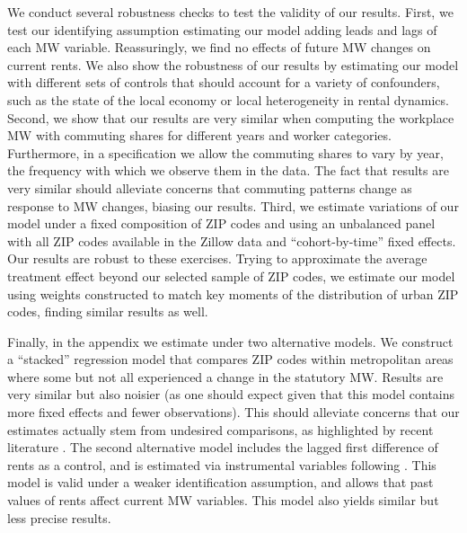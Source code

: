 
We conduct several robustness checks to test the validity of our results.
First, we test our identifying assumption estimating our model adding leads and 
lags of each MW variable.
Reassuringly, we find no effects of future MW changes on current rents.
We also show the robustness of our results by estimating our model with 
different sets of controls that should account for a variety of confounders, 
such as the state of the local economy or local heterogeneity in 
rental dynamics.
Second, we show that our results are very similar when computing the workplace
MW with commuting shares for different years and worker categories.
Furthermore, in a specification we allow the commuting shares to vary by year, 
the frequency with which we observe them in the data.
The fact that results are very similar should alleviate concerns that commuting 
patterns change as response to MW changes, biasing our results.
Third, we estimate variations of our model under a fixed composition of ZIP 
codes and using an unbalanced panel with all ZIP codes available in the Zillow
data and ``cohort-by-time'' fixed effects.
Our results are robust to these exercises.
Trying to approximate the average treatment effect beyond our selected sample 
of ZIP codes, we estimate our model using weights constructed to match key 
moments of the distribution of urban ZIP codes, finding similar results as well.

Finally, in the appendix we estimate under two alternative models.
We construct a ``stacked'' regression model that compares ZIP codes within 
metropolitan areas where some but not all experienced a change in the 
statutory MW.
Results are very similar but also noisier (as one should expect given
that this model contains more fixed effects and fewer observations).
This should alleviate concerns that our estimates actually stem from undesired 
comparisons, as highlighted by recent literature 
\parencite{deChaisemartinEtAl2022,RothEtAl2022}.
The second alternative model includes the lagged first difference of rents as 
a control, and is estimated via instrumental variables following 
\textcite{ArellanoBond1991, MeerWest2016}.
This model is valid under a weaker identification assumption, and allows that
past values of rents affect current MW variables.
This model also yields similar but less precise results.

